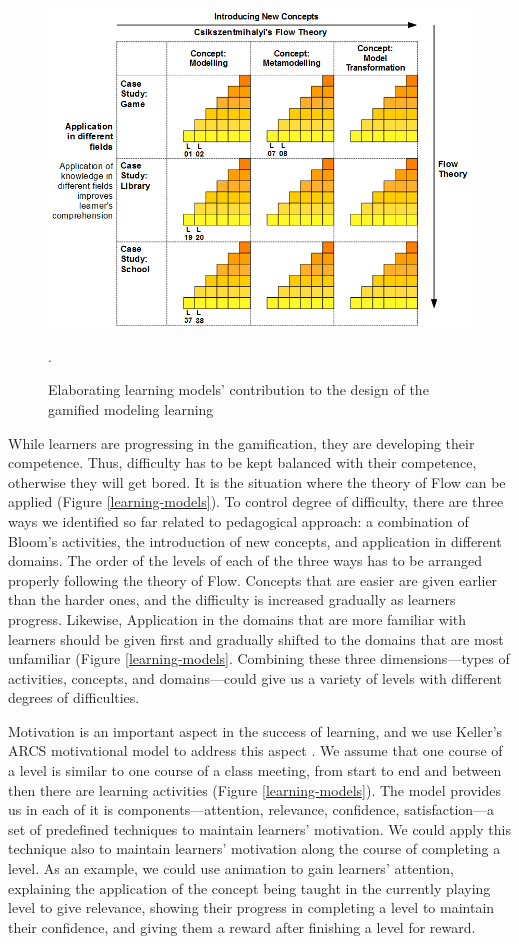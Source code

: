 \documentclass[12pt, a4paper]{report}
\begin{document}
{\begin{figure}[ht]
\centering
\includegraphics[width=\textwidth]{learning-models2}
\caption{Elaborating learning models' contribution to the design of the gamified modeling learning}.
\label{learning-models2}
\end{figure}

While learners are progressing in the gamification, they are developing their competence. Thus, difficulty has to be kept balanced with their competence, otherwise they will get bored. It is the situation where the theory of Flow can be applied (Figure \ref{learning-models}). To control degree of difficulty, there are three ways we identified so far related to pedagogical approach: a combination of Bloom's activities, the introduction of new concepts, and application in different domains. The order of the levels of each of the three ways has to be arranged properly following the theory of Flow. Concepts that are easier are given earlier than the harder ones, and the difficulty is increased gradually as learners progress. Likewise, Application in the domains that are more familiar with learners should be given first and gradually shifted to the domains that are most unfamiliar (Figure \ref{learning-models}. Combining these three dimensions---types of activities, concepts, and domains---could give us a variety of levels with different degrees of difficulties.

Motivation is an important aspect in the success of learning, and we use Keller's ARCS motivational model to address this aspect \cite{keller2010motivational}. We assume that one course of a level is similar to one course of a class meeting, from start to end and between then there are learning activities (Figure \ref{learning-models}). The model provides us in each of it is components---attention, relevance, confidence, satisfaction---a set of predefined techniques to maintain learners' motivation. We could apply this technique also to maintain learners' motivation along the course of completing a level. As an example, we could use animation to gain learners' attention, explaining the application of the concept being taught in the currently playing level to give relevance, showing their progress in completing a level to maintain their confidence, and giving them a reward after finishing a level for reward.
 
}
\end{document}
